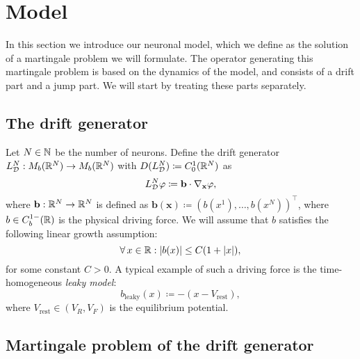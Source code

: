 \section{Model}

In this section we introduce our neuronal model, which we define as the solution of a martingale problem we will formulate.
The operator generating this martingale problem is based on the dynamics of the model, and consists of a drift part and a jump part.
We will start by treating these parts separately.

\subsection{The drift generator}

Let \( N \in \mathbb{N} \) be the number of neurons.
Define the drift generator \(L_{\mathcal{D}}^{N} : M_b(\mathbb{R}^N) \to M_b(\mathbb{R}^N)\) with \(D(L_{\mathcal{D}}^N) \coloneqq C_0^1(\mathbb{R}^N)\) as
\begin{equation}
  L_{\mathcal{D}}^{N}\varphi \coloneqq \mathbf{b} \cdot \nabla_{\mathbf{x}} \varphi,
\end{equation}
where \(\mathbf{b} : \mathbb{R}^N \to \mathbb{R}^N\) is defined as \( \bm{b}(\bm{x}) \coloneqq (b(x^1), \dots, b(x^N))^\top \), where \(b \in C_b^{1-}(\mathbb{R})\) is the physical driving force.
We will assume that \(b\) satisfies the following linear growth assumption:
\begin{equation}
  \forall x \in \potspace : \abs{b(x)} \leq C (1 + \abs{x}),
\end{equation}
for some constant \(C > 0\).
\newline
A typical example of such a driving force is the time-homogeneous \textit{leaky model}:
\begin{equation}
  b_{\mathrm{leaky}}(x) \coloneqq -(x - V_\mathrm{rest}),
\end{equation}
where \(V_\mathrm{rest} \in (V_R, V_F)\) is the equilibrium potential.

\subsection{Martingale problem of the drift generator}

